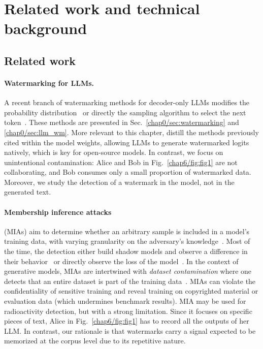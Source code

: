 
\section{Related work and technical background}\label{chap6/sec:background}




\subsection{Related work}\label{chap6/subsec:related}

\paragraph{Watermarking for LLMs.}
A recent branch of watermarking methods for decoder-only LLMs modifies the probability distribution~\citep{kirchenbauer2023watermark} or directly the sampling algorithm to select the next token~\citep{aaronson2023watermarking, kuditipudi2023robust}.
These methods are presented in Sec.~\ref{chap0/sec:watermarking} and \ref{chap0/sec:llm_wm}.
More relevant to this chapter, \citet{gu2023learnability} distill the methods previously cited within the model weights, allowing LLMs to generate watermarked logits natively, which is key for open-source models.
In contrast, we focus on unintentional contamination: 
Alice and Bob in Fig.~\ref{chap6/fig:fig1} are not collaborating, and Bob consumes only a small proportion of watermarked data.
Moreover, we study the detection of a watermark in the model, not in the generated text.

\vspace{-0.5em}\paragraph{Membership inference attacks} 
(MIAs) aim to determine whether an arbitrary sample is included in a model's training data, with varying granularity on the adversary's knowledge~\citep{nasr2019comprehensive}.
Most of the time, the detection either build shadow models and observe a difference in their behavior~\citep{shokri2017membership, song2019auditing, hisamoto2020membership, mahloujifar2021membership} or directly observe the loss of the model~\citep{yeom2018privacy, sablayrolles2019white, watson2021importance, carlini2022membership}.
In the context of generative models, MIAs are intertwined with
\emph{dataset contamination} where one detects that an entire dataset
is part of the training data~\citep{shi2023detecting, golchin2023time}.
MIAs can violate the confidentiality of sensitive training and reveal training on copyrighted material or evaluation data (which undermines benchmark results).
MIA may be used for radioactivity detection, but with a strong limitation.
Since it focuses on specific pieces of text, Alice in Fig.~\ref{chap6/fig:fig1} has to record all the outputs of her LLM.
In contrast, our rationale is that watermarks carry a signal expected to be memorized at the corpus level due to its repetitive nature.

